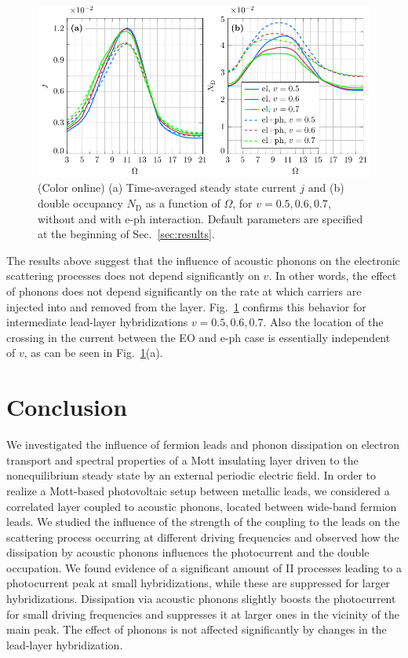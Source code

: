 \documentclass[aps,prb,groupedaddress,showpacs,twocolumn,superscriptaddress,10pt]{revtex4-2}
\begin{document}
\begin{figure}[b] 
\includegraphics[width=\linewidth]{Fig8.pdf}
\caption{(Color online) (a) Time-averaged steady state current $j$ and (b) double occupancy $N_{\text{D}}$ as a function of $\Omega$, for $v=0.5,0.6,0.7$, without and with e-ph interaction. Default parameters are specified at the beginning of Sec.~\ref{sec:results}.} 
\label{fig:j_vs_omega_mu1_sweep_v_E0_2_eph}
\end{figure} 
     
The results above suggest that the influence of acoustic phonons on the electronic scattering processes does not depend significantly on $v$. In other words, the effect of phonons does not depend significantly on the rate at which carriers are injected into and removed from the layer. Fig.~\ref{fig:j_vs_omega_mu1_sweep_v_E0_2_eph} confirms this behavior for intermediate lead-layer hybridizations $v=0.5,0.6,0.7$. Also the location of the crossing in the current  between the EO and e-ph case is essentially independent of $v$, as can be seen in Fig.~\ref{fig:j_vs_omega_mu1_sweep_v_E0_2_eph}(a).

\section{Conclusion}   
\label{sec:conclusions} 
 
We investigated the influence of fermion leads and phonon dissipation on electron transport and spectral properties of a Mott insulating layer driven to the nonequilibrium steady state by an external periodic electric field. In order to realize a Mott-based photovoltaic setup between metallic leads, we considered a correlated layer coupled to acoustic phonons, located between wide-band fermion leads. We studied the influence of the strength of the coupling to the leads on the scattering process occurring at different driving frequencies and observed how the dissipation by acoustic phonons influences the photocurrent and the double occupation. We found evidence of a significant amount of II processes leading to a photocurrent peak at small hybridizations, while these are suppressed  for larger hybridizations. Dissipation via acoustic phonons slightly boosts the photocurrent for small driving frequencies and suppresses it at larger ones in the vicinity of the main peak. The effect of phonons is not affected significantly by changes in the lead-layer hybridization.
\end{document}
